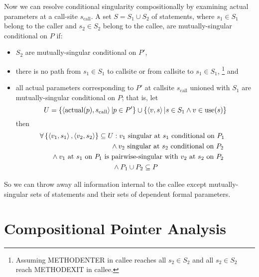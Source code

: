 \documentclass[11pt,notitlepage]{article}
\begin{document}
Now we can resolve conditional singularity compositionally by
examining actual parameters at a call-site $s_\text{call}$.
A set $S=S_1 \cup S_2$ of statements,
where $s_1\in S_1$ belong to the caller and $s_2\in S_2$ belong to the
callee, are mutually-singular conditional on $P$ if:
\begin{itemize}
\item $S_2$ are mutually-singular conditional on $P'$,
\item there is no path from $s_1 \in S_1$ to callsite or
             from callsite to $s_1\in S_1$,%
\footnote{Assuming METHODENTER in callee reaches all $s_2\in S_2$ and
          all $s_2\in S_2$ reach METHODEXIT in callee.}
and
\item all actual parameters corresponding to $P'$ at callsite $s_\text{call}$
  unioned with $S_1$ are mutually-singular conditional on $P$; that is, let
\begin{displaymath}
U = 
\left\{\left\langle \text{actual}(p), s_\text{call} \right\rangle | p \in P' \right\}
    \cup
\left\{\left\langle v,s \right\rangle|s\in S_1 \wedge v\in \text{use}(s)\right\}
\end{displaymath}
then
\begin{multline*}
\forall \left\{\tuple{v_1,s_1},\tuple{v_2,s_2}\right\} \subseteq U :
\hfill
v_1 \text{ singular at } s_1 \text{ conditional on } P_1
\mspace{-2mu}\quad\\\shoveright{{}\wedge
v_2 \text{ singular at } s_2 \text{ conditional on } P_2
}\\\shoveright{{}\wedge
v_1 \text{ at } s_1 \text{ on } P_1
\text{ is pairwise-singular with }
v_2 \text{ at } s_2 \text{ on } P_2
}\\{}\wedge
P_1 \cup P_2 \subseteq P
\end{multline*}
\end{itemize}

So we can throw away all information internal to the callee except
mutually-singular sets of statements and their sets of dependent
formal parameters.


\section{Compositional Pointer Analysis}
\end{document}
